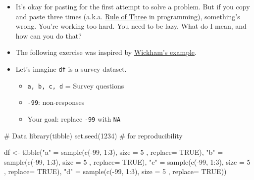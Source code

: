 \documentclass[
  letterpaper,
  DIV=11,
  numbers=noendperiod]{scrreprt}
\newenvironment{Shaded}{\begin{snugshade}}{\end{snugshade}}
\newcommand{\AttributeTok}[1]{\textcolor[rgb]{0.40,0.45,0.13}{#1}}
\newcommand{\CommentTok}[1]{\textcolor[rgb]{0.37,0.37,0.37}{#1}}
\newcommand{\ConstantTok}[1]{\textcolor[rgb]{0.56,0.35,0.01}{#1}}
\newcommand{\DecValTok}[1]{\textcolor[rgb]{0.68,0.00,0.00}{#1}}
\newcommand{\FunctionTok}[1]{\textcolor[rgb]{0.28,0.35,0.67}{#1}}
\newcommand{\NormalTok}[1]{\textcolor[rgb]{0.00,0.23,0.31}{#1}}
\newcommand{\OtherTok}[1]{\textcolor[rgb]{0.00,0.23,0.31}{#1}}
\newcommand{\SpecialCharTok}[1]{\textcolor[rgb]{0.37,0.37,0.37}{#1}}
\newcommand{\StringTok}[1]{\textcolor[rgb]{0.13,0.47,0.30}{#1}}
\begin{document}
\begin{itemize}
\item
  It's okay for pasting for the first attempt to solve a problem. But if
  you copy and paste three times (a.k.a.
  \href{https://en.wikipedia.org/wiki/Rule_of_three_(computer_programming)}{Rule
  of Three} in programming), something's wrong. You're working too hard.
  You need to be lazy. What do I mean, and how can you do that?
\item
  The following exercise was inspired by
  \href{http://adv-r.had.co.nz/Functional-programming.html}{Wickham's
  example}.
\item
  Let's imagine \texttt{df} is a survey dataset.

  \begin{itemize}
  \item
    \texttt{a,\ b,\ c,\ d} = Survey questions
  \item
    \texttt{-99}: non-responses
  \item
    Your goal: replace \texttt{-99} with \texttt{NA}
  \end{itemize}
\end{itemize}

\begin{Shaded}
\begin{Highlighting}[]
\CommentTok{\# Data}
\FunctionTok{library}\NormalTok{(tibble)}
\FunctionTok{set.seed}\NormalTok{(}\DecValTok{1234}\NormalTok{) }\CommentTok{\# for reproducibility }

\NormalTok{df }\OtherTok{\textless{}{-}} \FunctionTok{tibble}\NormalTok{(}\StringTok{"a"} \OtherTok{=} \FunctionTok{sample}\NormalTok{(}\FunctionTok{c}\NormalTok{(}\SpecialCharTok{{-}}\DecValTok{99}\NormalTok{, }\DecValTok{1}\SpecialCharTok{:}\DecValTok{3}\NormalTok{), }\AttributeTok{size =} \DecValTok{5}\NormalTok{ , }\AttributeTok{replace=} \ConstantTok{TRUE}\NormalTok{),}
             \StringTok{"b"} \OtherTok{=} \FunctionTok{sample}\NormalTok{(}\FunctionTok{c}\NormalTok{(}\SpecialCharTok{{-}}\DecValTok{99}\NormalTok{, }\DecValTok{1}\SpecialCharTok{:}\DecValTok{3}\NormalTok{), }\AttributeTok{size =} \DecValTok{5}\NormalTok{ , }\AttributeTok{replace=} \ConstantTok{TRUE}\NormalTok{),}
             \StringTok{"c"} \OtherTok{=} \FunctionTok{sample}\NormalTok{(}\FunctionTok{c}\NormalTok{(}\SpecialCharTok{{-}}\DecValTok{99}\NormalTok{, }\DecValTok{1}\SpecialCharTok{:}\DecValTok{3}\NormalTok{), }\AttributeTok{size =} \DecValTok{5}\NormalTok{ , }\AttributeTok{replace=} \ConstantTok{TRUE}\NormalTok{),}
             \StringTok{"d"} \OtherTok{=} \FunctionTok{sample}\NormalTok{(}\FunctionTok{c}\NormalTok{(}\SpecialCharTok{{-}}\DecValTok{99}\NormalTok{, }\DecValTok{1}\SpecialCharTok{:}\DecValTok{3}\NormalTok{), }\AttributeTok{size =} \DecValTok{5}\NormalTok{ , }\AttributeTok{replace=} \ConstantTok{TRUE}\NormalTok{))}
\end{Highlighting}
\end{Shaded}
\end{document}
